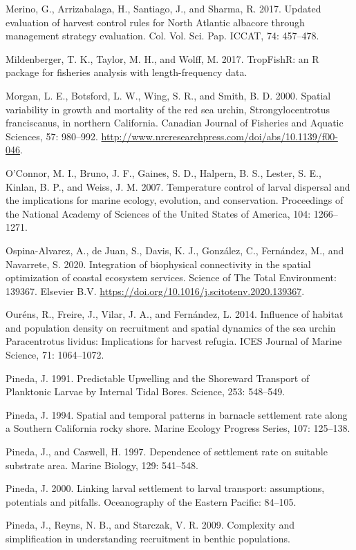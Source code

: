 \documentclass[12pt]{article}
\begin{document}
Merino, G., Arrizabalaga, H., Santiago, J., and Sharma, R. 2017. Updated
evaluation of harvest control rules for North Atlantic albacore through
management strategy evaluation. Col. Vol. Sci. Pap. ICCAT, 74: 457--478.

Mildenberger, T. K., Taylor, M. H., and Wolff, M. 2017. TropFishR: an R
package for fisheries analysis with length-frequency data.

Morgan, L. E., Botsford, L. W., Wing, S. R., and Smith, B. D. 2000.
Spatial variability in growth and mortality of the red sea urchin,
Strongylocentrotus franciscanus, in northern California. Canadian
Journal of Fisheries and Aquatic Sciences, 57: 980--992.
\url{http://www.nrcresearchpress.com/doi/abs/10.1139/f00-046}.

O'Connor, M. I., Bruno, J. F., Gaines, S. D., Halpern, B. S., Lester, S.
E., Kinlan, B. P., and Weiss, J. M. 2007. Temperature control of larval
dispersal and the implications for marine ecology, evolution, and
conservation. Proceedings of the National Academy of Sciences of the
United States of America, 104: 1266--1271.

Ospina-Alvarez, A., de Juan, S., Davis, K. J., González, C., Fernández,
M., and Navarrete, S. 2020. Integration of biophysical connectivity in
the spatial optimization of coastal ecosystem services. Science of The
Total Environment: 139367. Elsevier B.V.
\url{https://doi.org/10.1016/j.scitotenv.2020.139367}.

Ouréns, R., Freire, J., Vilar, J. A., and Fernández, L. 2014. Influence
of habitat and population density on recruitment and spatial dynamics of
the sea urchin Paracentrotus lividus: Implications for harvest refugia.
ICES Journal of Marine Science, 71: 1064--1072.

Pineda, J. 1991. Predictable Upwelling and the Shoreward Transport of
Planktonic Larvae by Internal Tidal Bores. Science, 253: 548--549.

Pineda, J. 1994. Spatial and temporal patterns in barnacle settlement
rate along a Southern California rocky shore. Marine Ecology Progress
Series, 107: 125--138.

Pineda, J., and Caswell, H. 1997. Dependence of settlement rate on
suitable substrate area. Marine Biology, 129: 541--548.

Pineda, J. 2000. Linking larval settlement to larval transport:
assumptions, potentials and pitfalls. Oceanography of the Eastern
Pacific: 84--105.

Pineda, J., Reyns, N. B., and Starczak, V. R. 2009. Complexity and
simplification in understanding recruitment in benthic populations.
\end{document}
